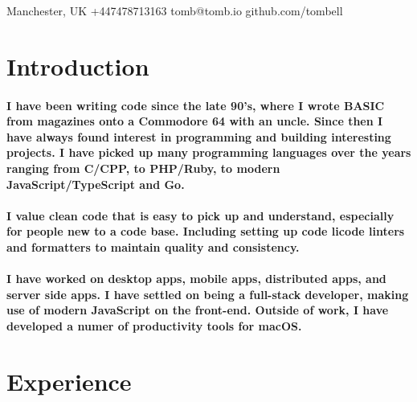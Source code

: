 \maketitle

\begin{center}
  \raisebox{0\height}{\small\faMapMarker} Manchester, UK
  \hspace{1 cm}
  \raisebox{-0.1\height}{\small\faMobile} +447478713163
  \hspace{1 cm}
  \raisebox{-0.1\height}{\small\faEnvelope} tomb@tomb.io
  \hspace{1 cm}
  \raisebox{-0.1\height}{\small\faGithubAlt} github.com/tombell
\end{center}

\section{Introduction}
\paragraph{I have been writing code since the late 90's, where I wrote BASIC
from magazines onto a Commodore 64 with an uncle. Since then I have always found
interest in programming and building interesting projects. I have picked up many
programming languages over the years ranging from C/CPP, to PHP/Ruby, to modern
JavaScript/TypeScript and Go.}

\paragraph{I value clean code that is easy to pick up and understand, especially
for people new to a code base. Including setting up code licode linters and
formatters to maintain quality and consistency.}

\paragraph{I have worked on desktop apps, mobile apps, distributed apps, and
server side apps. I have settled on being a full-stack developer, making use of
modern JavaScript on the front-end. Outside of work, I have developed a numer of
productivity tools for macOS.}

\section{Experience}

